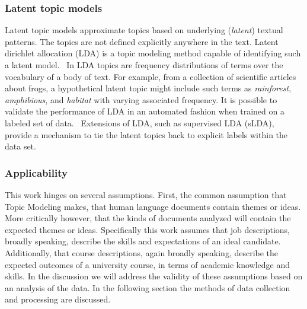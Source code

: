 \subsubsection{Latent topic models}

Latent topic models approximate topics based on underlying (\textit{latent}) textual patterns.
The topics are not defined explicitly anywhere in the text.
Latent dirichlet allocation (LDA) is a topic modeling method capable of identifying such a latent model.~\cite{blei2003}
In LDA topics are frequency distributions of terms over the vocabulary of a body of text.
For example, from a collection of scientific articles about frogs, a hypothetical latent topic might include such terms as \textit{rainforest}, \textit{amphibious}, and \textit{habitat} with varying associated frequency.
It is possible to validate the performance of LDA in an automated fashion when trained on a labeled set of data.~\cite{ramirez2012}
Extensions of LDA, such as supervised LDA (sLDA), provide a mechanism to tie the latent topics back to explicit labels within the data set.~\cite{mcauliffe2008}



\subsubsection{Applicability}

This work hinges on several assumptions.
First, the common assumption that Topic Modeling makes, that human language documents contain themes or ideas.
More critically however, that the kinds of documents analyzed will contain the expected themes or ideas.
Specifically this work assumes that job descriptions, broadly speaking, describe the skills and expectations of an ideal candidate.
Additionally, that course descriptions, again broadly speaking, describe the expected outcomes of a university course, in terms of academic knowledge and skills.
In the discussion we will address the validity of these assumptions based on an analysis of the data.
In the following section the methods of data collection and processing are discussed.
